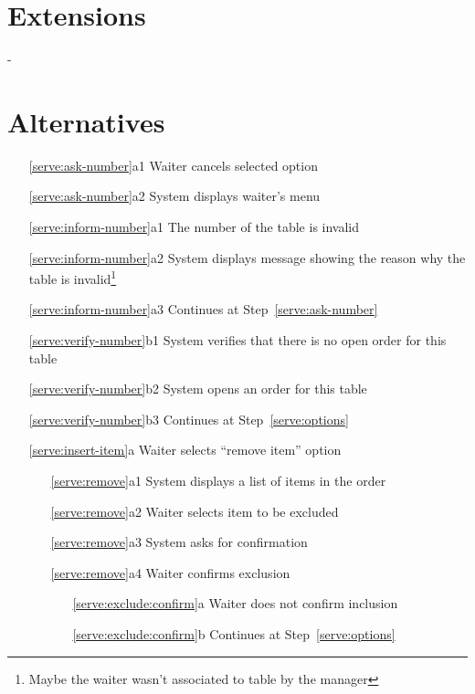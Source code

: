 \documentclass[a4paper,11pt,oneside]{book}
\makeatletter
\newcommand{\cancel}[1]{#1 cancels selected option}
\newcommand{\menu}[1]{System displays #1's menu}
\newcommand{\goto}[1]{Continues at Step~\ref{#1}}
\newcommand{\customlabel}[2]{#2\def\@currentlabel{#2}\label{#1}}
\makeatother
\begin{document}
\section{Extensions}

-

\section{Alternatives}

\begin{enumerate}
  \item [\ref{serve:ask-number}a1] \cancel{Waiter}
  \item [\ref{serve:ask-number}a2] \menu{waiter}
    \\
  \item [\ref{serve:inform-number}a1] The number of the table is invalid
  \item [\ref{serve:inform-number}a2] System displays message showing the reason why the table is invalid\footnote{Maybe the waiter wasn't associated to table by the manager}
  \item [\ref{serve:inform-number}a3] \goto{serve:ask-number}
    \\
  \item [\ref{serve:verify-number}b1] System verifies that there is no open order for this table
  \item [\ref{serve:verify-number}b2] System opens an order for this table
  \item [\ref{serve:verify-number}b3] \goto{serve:options}
    \\
  \item [\customlabel{serve:remove}{\ref{serve:insert-item}a}]Waiter selects ``remove item'' option
    \begin{enumerate}
      \item [\ref{serve:remove}a1] System displays a list of items in the order
      \item [\ref{serve:remove}a2] Waiter selects item to be excluded
      \item [\ref{serve:remove}a3] System asks for confirmation
      \item [\customlabel{serve:exclude:confirm}{\ref{serve:remove}a4}] Waiter confirms exclusion
        \begin{enumerate}
          \item [\ref{serve:exclude:confirm}a] Waiter does not confirm inclusion
          \item [\ref{serve:exclude:confirm}b] \goto{serve:options}

\end{enumerate}
\end{enumerate}
\end{enumerate}
\end{document}

